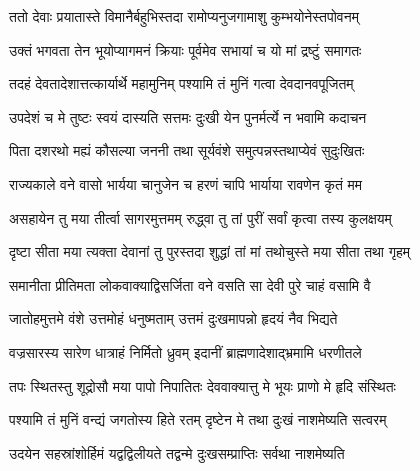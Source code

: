 

\storymeta



\twolineshloka
{ततो देवाः प्रयातास्ते विमानैर्बहुभिस्तदा}
{रामोप्यनुजगामाशु कुम्भयोनेस्तपोवनम्}%

\twolineshloka
{उक्तं भगवता तेन भूयोप्यागमनं क्रियाः}
{पूर्वमेव सभायां च यो मां द्रष्टुं समागतः}%

\twolineshloka
{तदहं देवतादेशात्तत्कार्यार्थे महामुनिम्}
{पश्यामि तं मुनिं गत्वा देवदानवपूजितम्}%

\twolineshloka
{उपदेशं च मे तुष्टः स्वयं दास्यति सत्तमः}
{दुःखी येन पुनर्मर्त्ये न भवामि कदाचन}%

\twolineshloka
{पिता दशरथो मह्यं कौसल्या जननी तथा}
{सूर्यवंशे समुत्पन्नस्तथाप्येवं सुदुःखितः}%

\twolineshloka
{राज्यकाले वने वासो भार्यया चानुजेन च}
{हरणं चापि भार्याया रावणेन कृतं मम}%

\twolineshloka
{असहायेन तु मया तीर्त्वा सागरमुत्तमम्}
{रुद्ध्वा तु तां पुरीं सर्वां कृत्वा तस्य कुलक्षयम्}%

\twolineshloka
{दृष्टा सीता मया त्यक्ता देवानां तु पुरस्तदा}
{शुद्धां तां मां तथोचुस्ते मया सीता तथा गृहम्}%

\twolineshloka
{समानीता प्रीतिमता लोकवाक्याद्विसर्जिता}
{वने वसति सा देवी पुरे चाहं वसामि वै}%

\twolineshloka
{जातोहमुत्तमे वंशे उत्तमोहं धनुष्मताम्}
{उत्तमं दुःखमापन्नो हृदयं नैव भिद्यते}%

\twolineshloka
{वज्रसारस्य सारेण धात्राहं निर्मितो ध्रुवम्}
{इदानीं ब्राह्मणादेशाद्भ्रमामि धरणीतले}%

\twolineshloka
{तपः स्थितस्तु शूद्रोसौ मया पापो निपातितः}
{देववाक्यात्तु मे भूयः प्राणो मे हृदि संस्थितः}%

\twolineshloka
{पश्यामि तं मुनिं वन्द्यं जगतोस्य हिते रतम्}
{दृष्टेन मे तथा दुःखं नाशमेष्यति सत्वरम्}%

\twolineshloka
{उदयेन सहस्रांशोर्हिमं यद्वद्विलीयते}
{तद्वन्मे दुःखसम्प्राप्तिः सर्वथा नाशमेष्यति}%

